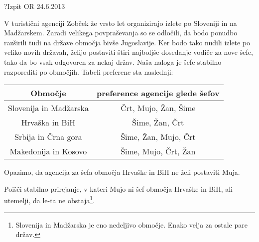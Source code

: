 \begin{naloga}{?}{Izpit OR 24.6.2013}
\begin{vprasanje}
V turistični agenciji Zobček že vrsto let
organizirajo izlete po Sloveniji in na Madžarskem.
Zaradi velikega povpraševanja so se odločili,
da bodo ponudbo razširili tudi na države območja bivše Jugoslavije.
Ker bodo tako nudili izlete po veliko novih državah,
želijo postaviti štiri najboljše dosedanje vodiče za nove šefe,
tako da bo vsak odgovoren za nekaj držav.
Naša naloga je šefe stabilno razporediti po območjih.
Tabeli preferenc sta naslednji:
\begin{center}

\bigskip
\begin{tabular}{c|c}
Območje                & preference agencije glede šefov \\ \hline
Slovenija in Madžarska & Črt, Mujo, Žan, Šime \\
Hrvaška in BiH         & Šime, Žan, Črt \\
Srbija in Črna gora    & Šime, Žan, Mujo, Črt \\
Makedonija in Kosovo   & Šime, Mujo, Črt, Žan
\end{tabular}
\end{center}
Opazimo, da agencija za šefa območja Hrvaške in BiH ne želi postaviti Muja.

Poišči stabilno prirejanje, v kateri Mujo ni šef območja Hrvaške in BiH,
ali utemelji, da le-ta ne obstaja\footnote{
Slovenija in Madžarska je eno nedeljivo območje.
Enako velja za ostale pare držav.
}.
\end{vprasanje}
\begin{odgovor}
\end{odgovor}
\end{naloga}
